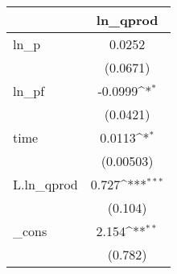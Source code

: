 {
\def\sym#1{\ifmmode^{#1}\else\(^{#1}\)\fi}
\begin{tabular}{l*{1}{c}}
\hline\hline
            &\multicolumn{1}{c}{ln\_qprod}\\
\hline
ln\_p        &      0.0252         \\
            &    (0.0671)         \\
[1em]
ln\_pf       &     -0.0999\sym{*}  \\
            &    (0.0421)         \\
[1em]
time        &      0.0113\sym{*}  \\
            &   (0.00503)         \\
[1em]
L.ln\_qprod  &       0.727\sym{***}\\
            &     (0.104)         \\
[1em]
\_cons      &       2.154\sym{**} \\
            &     (0.782)         \\
\hline\hline
\end{tabular}
}
